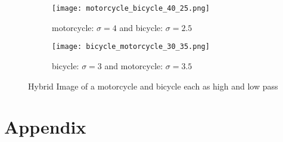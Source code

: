 \documentclass[a4paper,10pt]{article}
\begin{document}
\begin{figure}[ht!]
    \centering
    \begin{subfigure}[b]{\textwidth}
        \texttt{[image: motorcycle\_bicycle\_40\_25.png]}
        \caption{motorcycle: $\sigma = 4$ and bicycle: $\sigma = 2.5$
                 \label{fig:moto_bike}}
    \end{subfigure}
    \begin{subfigure}[b]{\textwidth}
        \texttt{[image: bicycle\_motorcycle\_30\_35.png]}
        \caption{bicycle: $\sigma = 3$ and motorcycle: $\sigma = 3.5$
                 \label{fig:bike_moto}}
    \end{subfigure}
\caption{Hybrid Image of a motorcycle and bicycle each as high and low pass
         \label{fig:order_pass}}
\end{figure}

\clearpage
\section{Appendix}


\end{document}
